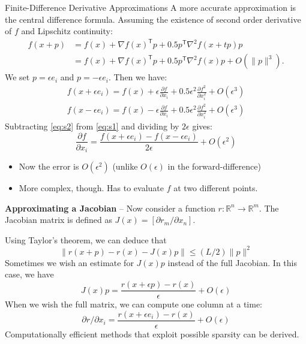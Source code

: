 \documentclass{beamer}
\newcommand{\tran}{\mathsf{T}}
\begin{document}
\begin{frame}[allowframebreaks]{Finite-Difference Derivative Approximations}
	A more accurate approximation is the central difference formula. Assuming the existence of second order derivative of $f$ and Lipschitz continuity:
	\begin{align}
	f(x+p) &= f(x) + \nabla f(x)^\tran p + 0.5 p^\tran \nabla^2 f(x+tp)p \\
		   &= f(x) + \nabla f(x)^\tran p + 0.5 p^\tran \nabla^2 f(x)p + O(\|p\|^3).
	\end{align}
	We set $p = \epsilon e_i$ and $p= -\epsilon e_i$. Then we have:
	\begin{gather}
		f(x+\epsilon e_i) = f(x) + \epsilon \frac{\partial f}{\partial x_i} + 0.5 \epsilon^2 \frac{\partial f^2}{\partial x_i^2} + O(\epsilon^3) \label{eq:s1} \\ 
		f(x-\epsilon e_i) = f(x) - \epsilon \frac{\partial f}{\partial x_i} + 0.5 \epsilon^2 \frac{\partial f^2}{\partial x_i^2} + O(\epsilon^3) \label{eq:s2}
	\end{gather} 
	Subtracting \eqref{eq:s2} from \eqref{eq:s1} and dividing by $2\epsilon$ gives:
	\begin{equation}
		\frac{\partial f}{\partial x_i} = \frac{f(x+\epsilon e_i) - f(x-\epsilon e_i)}{2 \epsilon} + O(\epsilon^2)
	\end{equation}
	\begin{itemize}
		\item Now the error is $O(\epsilon^2)$ (unlike $O(\epsilon)$ in the forward-difference)
		\item More complex, though. Has to evaluate $f$ at two different points.
	\end{itemize}

	\textbf{Approximating a Jacobian} -- 
	Now consider a function $r:\mathbb{R}^n\rightarrow \mathbb{R}^m$. The Jacobian matrix is defined as $J(x) = [ \partial r_m / \partial x_n ]$.
	
	Using Taylor's theorem, we can deduce that
	\[
		\| r(x+p) -r(x) - J(x)p\| \leq (L/2) \|p\|^2
	\]
	Sometimes we wish an estimate for $J(x)p$ instead of the full Jacobian. In this case, we have
	\[
		J(x)p = \frac{r(x+\epsilon p) - r(x)}{\epsilon} + O(\epsilon)
	\]
	When we wish the full matrix, we can compute one column at a time:
	\[
		\partial r / \partial x_i = \frac{r(x+\epsilon e_i)-r(x)}{\epsilon} + O(\epsilon)
	\]
	Computationally efficient methods that exploit possible sparsity can be derived.
	

\end{frame}
\end{document}
